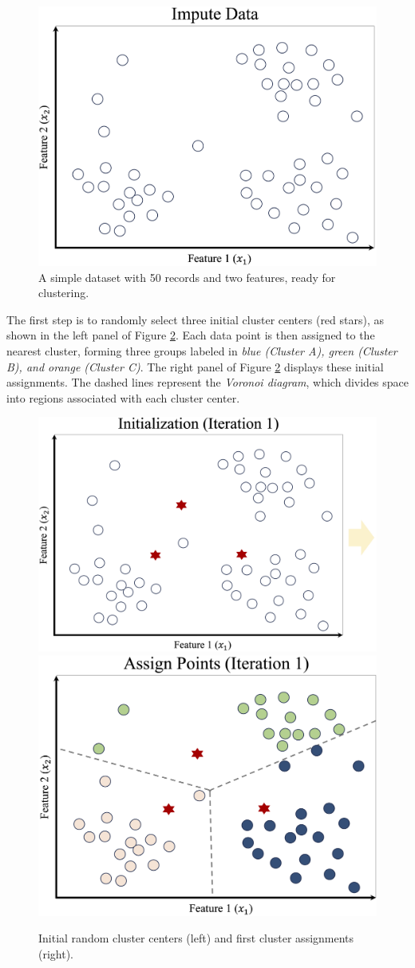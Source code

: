 \documentclass[
  11pt,
]{book}
\theoremstyle{definition}
\theoremstyle{definition}
\theoremstyle{definition}
\theoremstyle{definition}
\theoremstyle{remark}
\begin{document}
\begin{figure}[H]

{\centering \includegraphics[width=0.7\linewidth]{images/ch13_cluster_ex_1} 

}

\caption{A simple dataset with 50 records and two features, ready for clustering.}\label{fig:cluster-ex-1}
\end{figure}

The first step is to randomly select three initial cluster centers (red stars), as shown in the left panel of Figure \ref{fig:cluster-ex-2}. Each data point is then assigned to the nearest cluster, forming three groups labeled in \emph{blue (Cluster A), green (Cluster B), and orange (Cluster C)}. The right panel of Figure \ref{fig:cluster-ex-2} displays these initial assignments. The dashed lines represent the \emph{Voronoi diagram}, which divides space into regions associated with each cluster center.

\begin{figure}[H]

{\centering \includegraphics[width=0.45\linewidth]{images/ch13_cluster_ex_2} \includegraphics[width=0.45\linewidth]{images/ch13_cluster_ex_3} 

}

\caption{Initial random cluster centers (left) and first cluster assignments (right).}\label{fig:cluster-ex-2}
\end{figure}
\end{document}
